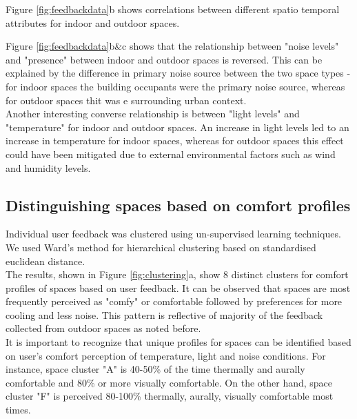 Figure \ref{fig:feedbackdata}b shows correlations between different spatio temporal attributes for indoor and outdoor spaces.

Figure \ref{fig:feedbackdata}b\&c shows that the relationship between "noise levels" and "presence" between indoor and outdoor spaces is reversed. This can be explained by the difference in primary noise source between the two space types - for indoor spaces the building occupants were the primary noise source, whereas for outdoor spaces thit was e surrounding urban context.\\

Another interesting converse relationship is between "light levels" and "temperature" for indoor and outdoor spaces. An increase in light levels led to an increase in temperature for indoor spaces, whereas for outdoor spaces this effect could have been mitigated due to external environmental factors such as wind and humidity levels.\\



\subsection{Distinguishing spaces based on comfort profiles}
\label{ch:userResults}

Individual user feedback was clustered using un-supervised learning techniques. We used Ward's method for hierarchical clustering based on standardised euclidean distance.\\

The results, shown in Figure \ref{fig:clustering}a, show 8 distinct clusters for comfort profiles of spaces based on user feedback. It can be observed that spaces are most frequently perceived as "comfy" or comfortable followed by preferences for more cooling and less noise. This pattern is reflective of majority of the feedback collected from outdoor spaces as noted before.\\

It is important to recognize that unique profiles for spaces can be identified based on user's comfort perception of temperature, light and noise conditions. For instance, space cluster "A" is 40-50\% of the time thermally and aurally comfortable and 80\% or more visually comfortable. On the other hand, space cluster "F" is perceived 80-100\% thermally, aurally, visually comfortable most times.         


